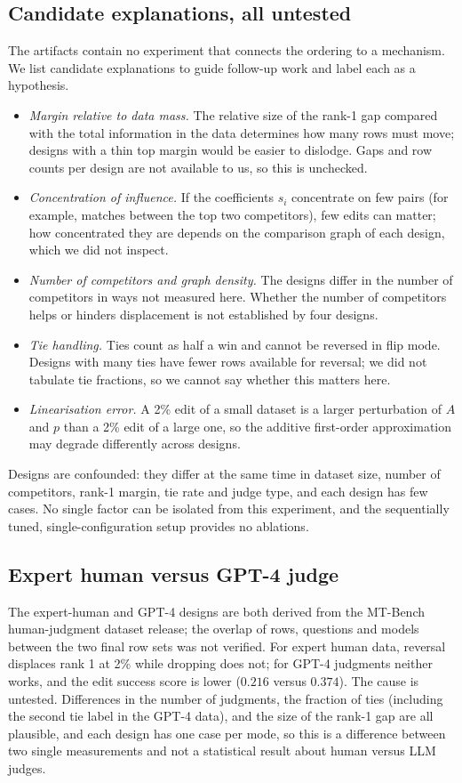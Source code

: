 \documentclass{article}
\begin{document}
\subsection{Candidate explanations, all untested}
The artifacts contain no experiment that connects the ordering to a mechanism. We list candidate explanations to guide follow-up work and label each as a hypothesis.
\begin{itemize}
\item \emph{Margin relative to data mass.} The relative size of the rank-1 gap compared with the total information in the data determines how many rows must move; designs with a thin top margin would be easier to dislodge. Gaps and row counts per design are not available to us, so this is unchecked.
\item \emph{Concentration of influence.} If the coefficients $s_i$ concentrate on few pairs (for example, matches between the top two competitors), few edits can matter; how concentrated they are depends on the comparison graph of each design, which we did not inspect.
\item \emph{Number of competitors and graph density.} The designs differ in the number of competitors in ways not measured here. Whether the number of competitors helps or hinders displacement is not established by four designs.
\item \emph{Tie handling.} Ties count as half a win and cannot be reversed in flip mode. Designs with many ties have fewer rows available for reversal; we did not tabulate tie fractions, so we cannot say whether this matters here.
\item \emph{Linearisation error.} A 2\% edit of a small dataset is a larger perturbation of $A$ and $p$ than a 2\% edit of a large one, so the additive first-order approximation may degrade differently across designs.
\end{itemize}
Designs are confounded: they differ at the same time in dataset size, number of competitors, rank-1 margin, tie rate and judge type, and each design has few cases. No single factor can be isolated from this experiment, and the sequentially tuned, single-configuration setup provides no ablations.

\subsection{Expert human versus GPT-4 judge}
The expert-human and GPT-4 designs are both derived from the MT-Bench human-judgment dataset release; the overlap of rows, questions and models between the two final row sets was not verified. For expert human data, reversal displaces rank 1 at 2\% while dropping does not; for GPT-4 judgments neither works, and the edit success score is lower ($0.216$ versus $0.374$). The cause is untested. Differences in the number of judgments, the fraction of ties (including the second tie label in the GPT-4 data), and the size of the rank-1 gap are all plausible, and each design has one case per mode, so this is a difference between two single measurements and not a statistical result about human versus LLM judges.
\end{document}
